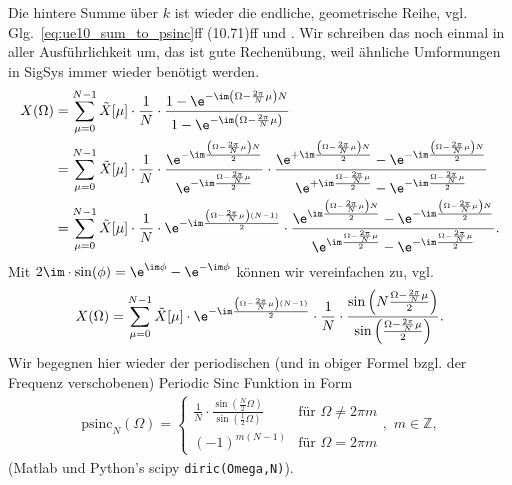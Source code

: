 \begin{ExCalc}
Die hintere Summe über $k$ ist wieder die endliche, geometrische Reihe,
vgl. Glg.~\eqref{eq:ue10_sum_to_psinc}ff (10.71)ff
und \cite[(3-39)]{Lyons2011}.
Wir schreiben das noch einmal in aller Ausführlichkeit um, das ist gute Rechenübung,
weil ähnliche Umformungen in SigSys immer wieder benötigt werden.
%
\begin{align}
X(\Omega)&=\sum_{\mu=0}^{N-1}\tilde{X}[\mu]\cdot\frac{1}{N}\cdot\frac{1-\e^{-\im\left(\Omega-\frac{2\pi}{N}\mu\right)N}}{1-\e^{-\im\left(\Omega-\frac{2\pi}{N}\mu\right)}}\\
&=\sum_{\mu=0}^{N-1}\tilde{X}[\mu]\cdot\frac{1}{N}\cdot\frac{\e^{-\im\frac{\left(\Omega-\frac{2\pi}{N}\mu\right)N}{2}}}{\e^{-\im\frac{\Omega-\frac{2\pi}{N}\mu}{2}}}\cdot\frac{\e^{+\im\frac{\left(\Omega-\frac{2\pi}{N}\mu\right)N}{2}}-\e^{-\im\frac{\left(\Omega-\frac{2\pi}{N}\mu\right)N}{2}}}{\e^{+\im\frac{\Omega-\frac{2\pi}{N}\mu}{2}}-\e^{-\im\frac{\Omega-\frac{2\pi}{N}\mu}{2}}}\\
&=\sum_{\mu=0}^{N-1}\tilde{X}[\mu]\cdot\frac{1}{N}\cdot\e^{-\im\frac{\left(\Omega-\frac{2\pi}{N}\mu\right)(N-1)}{2}}\cdot\frac{\e^{\im\frac{\left(\Omega-\frac{2\pi}{N}\mu\right)N}{2}}-\e^{-\im\frac{\left(\Omega-\frac{2\pi}{N}\mu\right)N}{2}}}{\e^{\im\frac{\Omega-\frac{2\pi}{N}\mu}{2}}-\e^{-\im\frac{\Omega-\frac{2\pi}{N}\mu}{2}}}.
\end{align}
%
Mit $2\im\cdot\sin(\phi)=\e^{\im \phi}-\e^{-\im \phi}$ können wir vereinfachen
zu, vgl.~%
\cite[(2.142)]{Rabiner1975}
%
\begin{equation}
X(\Omega)=\sum_{\mu=0}^{N-1}\tilde{X}[\mu]\cdot\e^{-\im\frac{\left(\Omega-\frac{2\pi}{N}\mu\right)(N-1)}{2}}\cdot\frac{1}{N}\cdot\frac{\sin\left(N\frac{\Omega-\frac{2\pi}{N}\mu}{2}\right)}{\sin\left(\frac{\Omega-\frac{2\pi}{N}\mu}{2}\right)}.
\end{equation}
%
Wir begegnen hier wieder der periodischen (und in obiger Formel bzgl. der Frequenz verschobenen) Periodic Sinc Funktion in Form
%
\begin{align}
\text{psinc}_N(\Omega)=\begin{cases}\frac{1}{N}\cdot\frac{\sin\left(\frac{N}{2}\Omega\right)}{\sin\left(\frac{1}{2}\Omega\right)}&\text{für }\Omega\neq2\pi m\\
(-1)^{m(N-1)}&\text{für }\Omega=2\pi m\end{cases},\,\,m\in\mathbb{Z},
\end{align}
%
(Matlab und Python's scipy \texttt{diric(Omega,N)}).


\end{ExCalc}
